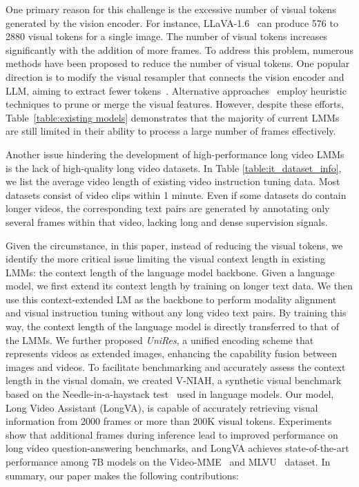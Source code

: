 One primary reason for this challenge is the excessive number of visual tokens generated by the vision encoder. For instance, LLaVA-1.6~\citep{liu2024llavanext} can produce 576 to 2880 visual tokens for a single image. The number of visual tokens increases significantly with the addition of more frames. To address this problem, numerous methods have been proposed to reduce the number of visual tokens. One popular direction is to modify the visual resampler that connects the vision encoder and LLM, aiming to extract fewer tokens~\citep{li2023blip2, li2023llamavid, cai2024matryoshka, cheng2024videollama}. Alternative approaches~\citep{chen2024image,shang2024llavaprumerge, jin2024chatunivi, zhou2024streaming} employ heuristic techniques to prune or merge the visual features. However, despite these efforts, Table~\ref{table:existing models} demonstrates that the majority of current LMMs are still limited in their ability to process a large number of frames effectively.

Another issue hindering the development of high-performance long video LMMs is the lack of high-quality long video datasets. In Table \ref{table:it_dataset_info}, we list the average video length of existing video instruction tuning data. Most datasets consist of video clips within 1 minute. Even if some datasets do contain longer videos, the corresponding text pairs are generated by annotating only several frames within that video, lacking long and dense supervision signals. 

Given the circumstance, in this paper, instead of reducing the visual tokens, we identify the more critical issue limiting the visual context length in existing LMMs: the context length of the language model backbone. Given a language model, we first extend its context length by training on longer text data. We then use this context-extended LM as the backbone to perform modality alignment and visual instruction tuning without any long video text pairs. By training this way, the context length of the language model is directly transferred to that of the LMMs. We further proposed \textit{UniRes}, a unified encoding scheme that represents videos as extended images, enhancing the capability fusion between images and videos.
To facilitate benchmarking and accurately assess the context length in the visual domain, we created V-NIAH, a synthetic visual benchmark based on the Needle-in-a-haystack test~\citep{niah} used in language models. Our model, Long Video Assistant (LongVA), is capable of accurately retrieving visual information from 2000 frames or more than 200K visual tokens. Experiments show that additional frames during inference lead to improved performance on long video question-answering benchmarks, and LongVA achieves state-of-the-art performance among 7B models on the Video-MME~\citep{fu2024videomme} and MLVU~\citep{zhou2024mlvu} dataset. 
In summary, our paper makes the following contributions:

